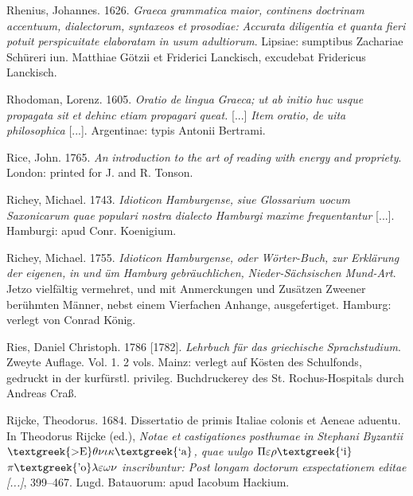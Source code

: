 Rhenius, Johannes. 1626. \textit{Graeca} \textit{grammatica} \textit{maior,} \textit{continens} \textit{doctrinam} \textit{accentuum,} \textit{dialectorum,} \textit{syntaxeos} \textit{et} \textit{prosodiae:} \textit{Accurata} \textit{diligentia} \textit{et} \textit{quanta} \textit{fieri} \textit{potuit} \textit{perspicuitate} \textit{elaboratam} \textit{in} \textit{usum} \textit{adultiorum}. Lipsiae: sumptibus Zachariae Schüreri iun. Matthiae Götzii et Friderici Lanckisch, excudebat Fridericus Lanckisch.

Rhodoman, Lorenz. 1605. \textit{Oratio} \textit{de} \textit{lingua} \textit{Graeca;} \textit{ut} \textit{ab} \textit{initio} \textit{huc} \textit{usque} \textit{propagata} \textit{sit} \textit{et} \textit{dehinc} \textit{etiam} \textit{propagari} \textit{queat.} [...] \textit{Item} \textit{oratio,} \textit{de} \textit{uita} \textit{philosophica} [...]. Argentinae: typis Antonii Bertrami.

Rice, John. 1765. \textit{An} \textit{introduction} \textit{to} \textit{the} \textit{art} \textit{of} \textit{reading} \textit{with} \textit{energy} \textit{and} \textit{propriety}. London: printed for J. and R. Tonson.

Richey, Michael. 1743. \textit{Idioticon} \textit{Hamburgense,} \textit{siue} \textit{Glossarium} \textit{uocum} \textit{Saxonicarum} \textit{quae} \textit{populari} \textit{nostra} \textit{dialecto} \textit{Hamburgi} \textit{maxime} \textit{frequentantur} [...]. Hamburgi: apud Conr. Koenigium.

Richey, Michael. 1755. \textit{Idioticon} \textit{Hamburgense,} \textit{oder} \textit{Wörter-Buch,} \textit{zur} \textit{Erklärung} \textit{der} \textit{eigenen,} \textit{in} \textit{und} \textit{üm} \textit{Hamburg} \textit{gebräuchlichen,} \textit{Nieder-Sächsischen} \textit{Mund-Art}. Jetzo vielfältig vermehret, und mit Anmerckungen und Zusätzen Zweener berühmten Männer, nebst einem Vierfachen Anhange, ausgefertiget. Hamburg: verlegt von Conrad König.

Ries, Daniel Christoph. 1786 [1782]. \textit{Lehrbuch} \textit{für} \textit{das} \textit{griechische} \textit{Sprachstudium}. Zweyte Auflage. Vol. 1. 2 vols. Mainz: verlegt auf Kösten des Schulfonds, gedruckt in der kurfürstl. privileg. Buchdruckerey des St. Rochus-Hospitals durch Andreas Craß.

Rijcke, Theodorus. 1684. Dissertatio de primis Italiae colonis et Aeneae aduentu. In Theodorus Rijcke (ed.), \textit{Notae} \textit{et} \textit{castigationes} \textit{posthumae} \textit{in} \textit{Stephani} \textit{Byzantii} \textit{$\text{\textgreek{>E}}\theta \nu \iota \kappa \text{\textgreek{`a}}$, quae uulgo $\Pi \varepsilon \rho \text{\textgreek{`i}}$ $\pi \text{\textgreek{'o}}\lambda \varepsilon \omega \nu $ inscribuntur: Post longam doctorum exspectationem editae [...]}, 399–467. Lugd. Batauorum: apud Iacobum Hackium.

